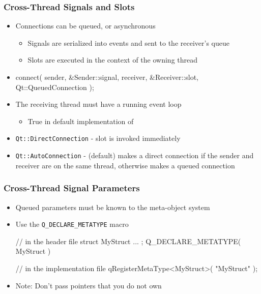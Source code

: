 \begin{slide}[fragile]
\frametitle{Cross-Thread Signals and Slots}

\begin{itemize}
\item Connections can be queued, or asynchronous
  \begin{itemize}
  \item Signals are serialized into events and sent to the receiver's queue
  \item Slots are executed in the context of the owning thread
  \end{itemize}
\item \begin{cpp}
connect( sender, &Sender::signal, receiver, &Receiver::slot,
         Qt::QueuedConnection );
\end{cpp}
\item The receiving thread must have a running event loop
  \begin{itemize}
  \item True in default implementation of 
  \end{itemize}
\item \texttt{Qt::DirectConnection} - slot is invoked immediately
\item \texttt{Qt::AutoConnection} - (default) makes a direct connection if the
sender and receiver are on the same thread, otherwise makes a queued connection
\end{itemize}

\end{slide}


\begin{slide}[fragile]
\frametitle{Cross-Thread Signal Parameters}

\begin{itemize}
\item Queued parameters must be known to the meta-object system
\item Use the \texttt{Q\_DECLARE\_METATYPE} macro
\begin{cpp}
// in the header file
struct MyStruct
{
    ...
};
Q_DECLARE_METATYPE( MyStruct )

// in the implementation file
qRegisterMetaType<MyStruct>( "MyStruct" );
\end{cpp}
\item Note: Don't pass pointers that you do not own
\end{itemize}

\end{slide}

